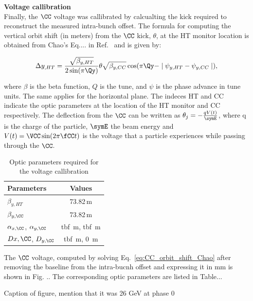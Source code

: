  

\newpage


\normalsize{\textbf{Voltage callibration}}\\
Finally, the $\CC$ voltage was callibrated by calcualting the kick required to reconstruct the measured intra-bunch offset. The formula for computing the vertical orbit shift (in meters) from the $\CC$ kick, $\theta$, at the HT monitor location is obtained from Chao's Eq.... in Ref.~\cite{Chao:1490001} and is given by:

\begin{equation}\label{eq:CC_orbit_shift_Chao}
   \Delta y_{,HT} = \frac{\sqrt{\beta_{y, HT}}}{2 \sin(\pi \Qy)} \theta \sqrt{\beta_{y, CC}} \cos(\pi \Qy - \mid \psi_{y, HT} - \psi_{y, CC} \mid),
\end{equation}

where $\beta$ is the beta function, $Q$ is the tune, and $\psi$ is the phase advance in tune units. The same applies for the horizontal plane. The indeces HT and CC indicate the optic parameters at the location of the HT monitor and CC respectively. The deflection from the $\CC$ can be written as $\theta_j = - \frac{q V(t)}{\symE}$, where q is the charge of the particle, $\symE$ the beam energy and $V(t) = \VCC \sin(2 \pi \fCC t) $ is the voltage that a particle experiences while passing through the $\CC$. 

\begin{table}[!hbt]
   \centering
   \caption{Optic parameters required for the voltage callibration}
   \begin{tabular}{lc}
       \toprule
       \textbf{Parameters} & \textbf{Values}\\
       \bottomrule
       $\beta_{y, HT}$  & 73.82\,m \\
       $\beta_{y, \CC}$  & 73.82\,m \\
       $\alpha_{x, \CC}$, $\alpha_{y, \CC}$  & tbf \,m,  tbf \,m \\
       $D{x, \CC}$, $D_{y, \CC}$  & tbf \,m,  0 \,m \\     
      \bottomrule
   \end{tabular}
   \label{tab:SPS_HT_Vcc}
\end{table}

The $\CC$ voltage, computed by solving Eq.~\ref{eq:CC_orbit_shift_Chao} after removing the baseline from the intra-bucnh offset and expressing it in mm is shown in Fig. .. The corresponding optic parameters are listed in Table...


Caption of figure, mention that it was 26 GeV at phase 0

